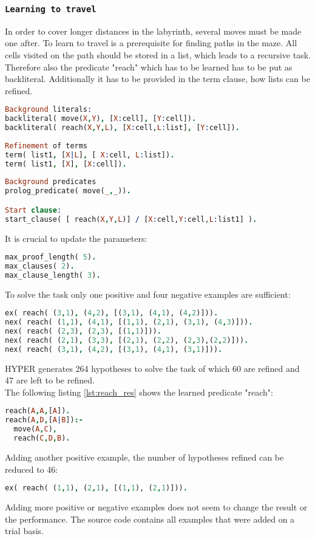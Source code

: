 \subsubsection{\texttt{Learning to travel}}
In order to cover longer distances in the labyrinth, several moves must be made one after.
To learn to travel is a prerequisite for finding paths in the maze. All cells visited on the path should be stored in a list, which leads to a recursive task.
Therefore also the predicate "reach" which has to be learned has to be put as backliteral.
Additionally it has to be provided in the term clause, how lists can be refined.
\begin{lstlisting}[label={lst:travel}, language=Prolog, caption=Learning the predicate "move", belowcaptionskip=1cm]
Background literals:
backliteral( move(X,Y), [X:cell], [Y:cell]).
backliteral( reach(X,Y,L), [X:cell,L:list], [Y:cell]).
 
Refinement of terms
term( list1, [X|L], [ X:cell, L:list]).
term( list1, [X], [X:cell]).
	
Background predicates
prolog_predicate( move(_,_)).

Start clause:
start_clause( [ reach(X,Y,L)] / [X:cell,Y:cell,L:list1] ).    
\end{lstlisting}
It is crucial to update the parameters:
\begin{lstlisting}[label={lst:reach_params}, language=Prolog, caption=Parameters for learning "reach", belowcaptionskip=1cm]
max_proof_length( 5).   
max_clauses( 2).        
max_clause_length( 3).  
\end{lstlisting}
To solve the task only one positive and four negative examples are sufficient:
\begin{lstlisting}[label={lst:reach_examples}, language=Prolog, caption= Examples for "reach", belowcaptionskip=1cm]
ex( reach( (3,1), (4,2), [(3,1), (4,1), (4,2)])).
nex( reach( (1,1), (4,1), [(1,1), (2,1), (3,1), (4,3)])).
nex( reach( (2,3), (2,3), [(1,1)])).
nex( reach( (2,1), (3,3), [(2,1), (2,2), (2,3),(2,2)])).
nex( reach( (3,1), (4,2), [(3,1), (4,1), (3,1)])).
\end{lstlisting}
HYPER generates 264 hypotheses to solve the task of which 60 are refined and 47 are left to be refined.\\
The following listing \ref{lst:reach_res} shows the learned predicate "reach":
\begin{lstlisting}[label={lst:reach_res}, language=Prolog, caption= Predicate "reach", belowcaptionskip=1cm]
reach(A,A,[A]).
reach(A,D,[A|B]):-
  move(A,C),
  reach(C,D,B).
\end{lstlisting}
Adding another positive example, the number of hypotheses refined can be reduced to 46:
\begin{lstlisting}[label={lst:reach_ex1}, language=Prolog, caption= Additional positive example for "reach", belowcaptionskip=1cm]
ex( reach( (1,1), (2,1), [(1,1), (2,1)])).
\end{lstlisting}
Adding more positive or negative examples does not seem to change the result or the performance. The source code contains all examples that were added on a trial basis.
